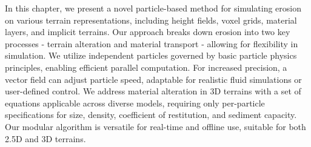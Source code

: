\abstract

In this chapter, we present a novel particle-based method for simulating erosion on various terrain representations, including height fields, voxel grids, material layers, and implicit terrains. Our approach breaks down erosion into two key processes - terrain alteration and material transport - allowing for flexibility in simulation. We utilize independent particles governed by basic particle physics principles, enabling efficient parallel computation. For increased precision, a vector field can adjust particle speed, adaptable for realistic fluid simulations or user-defined control. We address material alteration in 3D terrains with a set of equations applicable across diverse models, requiring only per-particle specifications for size, density, coefficient of restitution, and sediment capacity. Our modular algorithm is versatile for real-time and offline use, suitable for both 2.5D and 3D terrains.
\pagebreak

\minitoc


